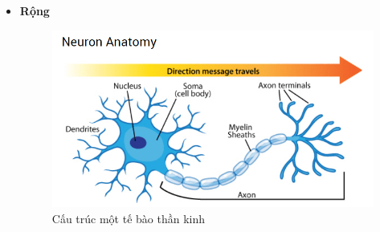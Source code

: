 \documentclass[12pt,a4paper,oneside]{book}
\numberwithin{equation}{chapter} %
\numberwithin{figure}{chapter} %
\numberwithin{table}{chapter} %
\begin{document}
\begin{itemize}
\item \textbf{Rộng}
\FloatBarrier
\begin{figure}[htp]
\begin{center}
\includegraphics[scale=0.8]{chap2/c2_figs/neuron.png}
\end{center}
\caption{Cấu trúc một tế bào thần kinh}
\label{fig:neuronsinhhoc}
\end{figure}
\FloatBarrier

\end{itemize}
\end{document}
